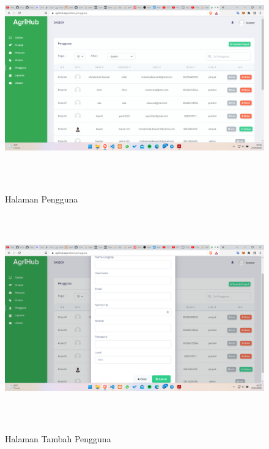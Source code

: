 \begin{enumerate}
\begin{enumerate}
			\begin{figure}[H]
				\centering
				{\includegraphics [width = 14.3cm, height= 9cm]{gambar/admin/pengguna}}
				\caption{Halaman Pengguna}
				\label{pengguna}
			\end{figure}

			\begin{figure}[H]
				\centering
				{\includegraphics [width = 14.3cm, height= 9cm]{gambar/admin/tambah_pengguna}}
				\caption{Halaman Tambah Pengguna}
				\label{tambah_pengguna}
			\end{figure}


\end{enumerate}
\end{enumerate}

